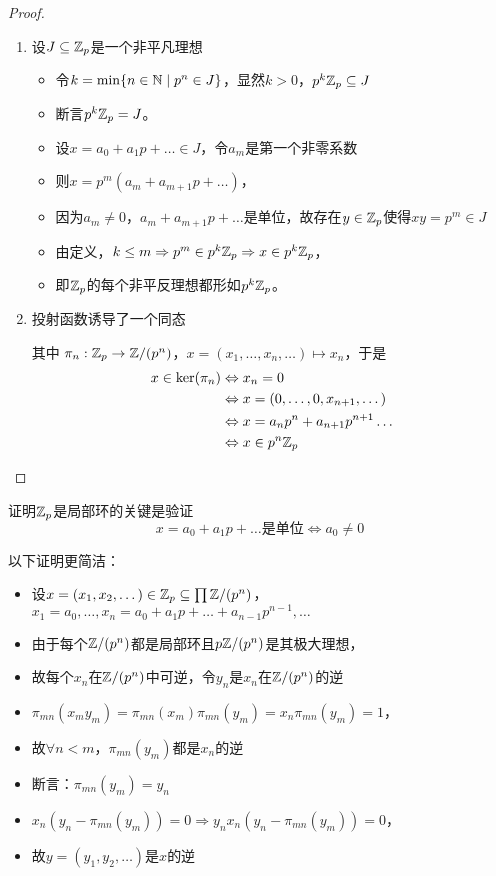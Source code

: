 \documentclass[11pt]{article}
\begin{document}
\begin{proof}
\begin{enumerate}
\item 设\(J\subseteq\mathbb{Z}_p\)是一个非平凡理想
\begin{itemize}
\item 令\(k=\min\{n\in\mathbb{N}\mid p^n\in J\}\)，显然\(k>0\)，\(p^k\mathbb{Z}_p\subseteq J\)
\item 断言\(p^k\mathbb{Z}_p=J\)。
\item 设\(x=a_0+a_1p+\dots\in J\)，令\(a_m\)是第一个非零系数
\item 则\(x=p^m(a_m+a_{m+1}p+\dots)\)，
\item 因为\(a_m\neq 0\)，\(a_m+a_{m+1}p+\dots\)是单位，故存在\(y\in\mathbb{Z}_p\)使得\(xy=p^m\in J\)
\item 由定义，\(k\le m\Rightarrow p^m\in p^k\mathbb{Z}_p\Rightarrow x\in p^k\mathbb{Z}_p\)，
\item 即\(\mathbb{Z}_p\)的每个非平反理想都形如\(p^k\mathbb{Z}_p\)。
\end{itemize}
\item 投射函数诱导了一个同态
\begin{center}\end{center}
其中 \(\pi_n:\mathbb{Z}_p\to\mathbb{Z}/(p^n)\)，\(x=(x_1,\dots,x_n,\dots)\mapsto x_n\)，于是
\begin{align*}
x\in\ker(\pi_n)&\Leftrightarrow x_n=0\\
&\Leftrightarrow x=(0,\dots,0,x_{n+1},\dots)\\
&\Leftrightarrow x=a_{n}p^n+a_{n+1}p^{n+1}\dots\\
&\Leftrightarrow x\in p^n\mathbb{Z}_p
\end{align*}
\end{enumerate}
\end{proof}

\begin{remark}
证明\(\mathbb{Z}_p\)是局部环的关键是验证
\begin{equation*}
x=a_0+a_1p+\dots\text{是单位}\Leftrightarrow a_0\neq 0
\end{equation*}
\end{remark}

以下证明更简洁：
\begin{itemize}
\item 设\(x=(x_1,x_2,\dots)\in\mathbb{Z}_p\subseteq\prod\mathbb{Z}/(p^n)\)，\(x_1=a_0,\dots,x_n=a_0+a_1p+\dots+a_{n-1}p^{n-1},\dots\)
\item 由于每个\(\mathbb{Z}/(p^n)\)都是局部环且\(p\mathbb{Z}/(p^n)\)是其极大理想，
\item 故每个\(x_n\)在\(\mathbb{Z}/(p^n)\)中可逆，令\(y_n\)是\(x_n\)在\(\mathbb{Z}/(p^n)\)的逆
\item \(\pi_{mn}(x_my_m)=\pi_{mn}(x_m)\pi_{mn}(y_m)=x_n\pi_{mn}(y_m)=1\)，
\item 故\(\forall n<m\)，\(\pi_{mn}(y_m)\)都是\(x_n\)的逆
\item 断言：\(\pi_{mn}(y_m)=y_n\)
\item \(x_n(y_n-\pi_{mn}(y_m))=0\Rightarrow y_nx_n(y_n-\pi_{mn}(y_m))=0\)，
\item 故\(y=(y_1,y_2,\dots)\)是\(x\)的逆
\end{itemize}
\end{document}
